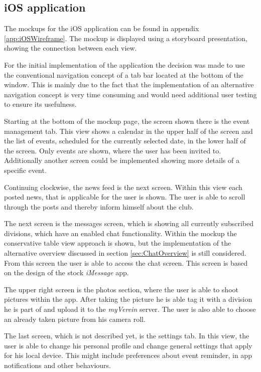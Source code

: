 \subsection{iOS application}
\label{sec:iOSMockup}
The mockups for the iOS application can be found in appendix \vref{app:iOSWireframe}. The mockup is displayed using a storyboard presentation, showing the connection between each view.

For the initial implementation of the application the decision was made to use the conventional navigation concept of a tab bar located at the bottom of the window. This is mainly due to the fact that the implementation of an alternative navigation concept is very time consuming and would need additional user testing to ensure its usefulness.

Starting at the bottom of the mockup page, the screen shown there is the event management tab. This view shows a calendar in the upper half of the screen and the list of events, scheduled for the currently selected date, in the lower half of the screen. Only events are shown, where the user has been invited to. Additionally another screen could be implemented showing more details of a specific event.

Continuing clockwise, the news feed is the next screen. Within this view each posted news, that is applicable for the user is shown. The user is able to scroll through the posts and thereby inform himself about the club.

The next screen is the messages screen, which is showing all currently subscribed divisions, which have an enabled chat functionality. Within the mockup the conservative table view approach is shown, but the implementation of the alternative overview discussed in section \vref{sec:ChatOverview} is still considered. From this screen the user is able to access the chat screen. This screen is based on the design of the stock \emph{iMessage} app.

The upper right screen is the photos section, where the user is able to shoot pictures within the app. After taking the picture he is able tag it with a division he is part of and upload it to the \emph{myVerein} server. The user is also able to choose an already taken picture from his camera roll.

The last screen, which is not described yet, is the settings tab. In this view, the user is able to change his personal profile and change general settings that apply for his local device. This might include preferences about event reminder, in app notifications and other behaviours.

